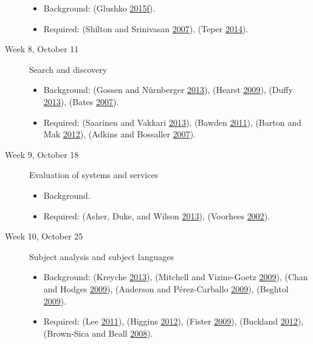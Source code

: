 \documentclass[]{article}
\providecommand{\tightlist}{%
  \setlength{\itemsep}{0pt}\setlength{\parskip}{0pt}}
\begin{document}
\begin{description}
\begin{itemize}
\tightlist
\item
  Background: (Glushko
  \protect\hyperlink{ref-glushkoux5forganizingux5f2015}{2015}\protect\hyperlink{ref-glushkoux5forganizingux5f2015}{f}).
\item
  Required: (Shilton and Srinivasan
  \protect\hyperlink{ref-shiltonux5fparticipatoryux5f2007}{2007}),
  (Teper \protect\hyperlink{ref-teperux5fselectionux5f2014}{2014}).
\end{itemize}
\item[Week 8, October 11]
Search and discovery

\begin{itemize}
\tightlist
\item
  Background: (Gossen and Nürnberger
  \protect\hyperlink{ref-gossenux5fspecificsux5f2013}{2013}), (Hearst
  \protect\hyperlink{ref-hearstux5fevaluationux5f2009}{2009}), (Duffy
  \protect\hyperlink{ref-duffyux5fsearchingux5f2013}{2013}), (Bates
  \protect\hyperlink{ref-batesux5fwhatux5f2007}{2007}).
\item
  Required: (Saarinen and Vakkari
  \protect\hyperlink{ref-saarinenux5fsignux5f2013}{2013}), (Bawden
  \protect\hyperlink{ref-bawdenux5fencounteringux5f2011}{2011}), (Barton
  and Mak \protect\hyperlink{ref-bartonux5foldux5f2012}{2012}), (Adkins
  and Bossaller
  \protect\hyperlink{ref-adkinsux5ffictionux5f2007}{2007}).
\end{itemize}
\item[Week 9, October 18]
Evaluation of systems and services

\begin{itemize}
\tightlist
\item
  Background.
\item
  Required: (Asher, Duke, and Wilson
  \protect\hyperlink{ref-asherux5fpathsux5f2013}{2013}), (Voorhees
  \protect\hyperlink{ref-petersux5fphilosophyux5f2002}{2002}).
\end{itemize}
\item[Week 10, October 25]
Subject analysis and subject languages

\begin{itemize}
\tightlist
\item
  Background: (Kreyche
  \protect\hyperlink{ref-kreycheux5fsubjectux5f2013}{2013}), (Mitchell
  and Vizine-Goetz
  \protect\hyperlink{ref-mitchellux5fdeweyux5f2009}{2009}), (Chan and
  Hodges \protect\hyperlink{ref-chanux5flibraryux5f2009}{2009}),
  (Anderson and Pérez-Carballo
  \protect\hyperlink{ref-andersonux5flibraryux5f2009}{2009}), (Beghtol
  \protect\hyperlink{ref-beghtolux5fclassificationux5f2009}{2009}).
\item
  Required: (Lee
  \protect\hyperlink{ref-leeux5findigenousux5f2011}{2011}), (Higgins
  \protect\hyperlink{ref-higginsux5flibraryux5f2012}{2012}), (Fister
  \protect\hyperlink{ref-fisterux5fdeweyux5f2009}{2009}), (Buckland
  \protect\hyperlink{ref-bucklandux5fobsolescenceux5f2012}{2012}),
  (Brown-Sica and Beall
  \protect\hyperlink{ref-brown-sicaux5flibraryux5f2008}{2008}).
\end{itemize}
\end{description}
\end{document}
